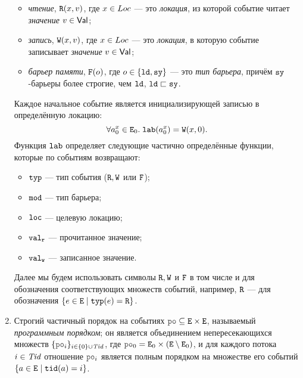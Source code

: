 \begin{definition}
\begin{enumerate}
\begin{itemize}%
\item \emph{чтение}, $\evlab{\lR}{o}{x}{v}$, где $x\in\Loc$ --- это
  \emph{локация}, из которой событие читает \emph{значение} $v\in\Val$;
\item \emph{запись}, $\evlab{\lW}{o}{x}{v}$, где $x\in\Loc$ --- это
  \emph{локация}, в которую событие записывает \emph{значение} $v\in\Val$;
\item \emph{барьер памяти}, $\flab{o}$, где $o\in \{\ld,\full\}$ --- это \emph{тип барьера}, причём $\full$-барьеры более строгие, чем
  $\ld$, $\ld \sqsu \full$.
\end{itemize}%
Каждое начальное событие является инициализирующей записью в определённую локацию:
\[\forall a^x_0 \in \lE_0. \; \lLAB(a^x_0) = \evlab{\lW}{\pln}{x}{0}.\]
Функция $\lLAB$ определяет следующие частично определённые функции, которые по событиям возвращают:
\begin{itemize}
  \item $\lTYP$ --- тип события ($\lR,\lW$ или $\lF$);
  \item $\lMOD$ --- тип барьера;
  \item $\lLOC$ --- целевую локацию;
  \item $\lVALR$ --- прочитанное значение;
  \item $\lVALW$ --- записанное значение.
\end{itemize}
Далее мы будем использовать символы $\lR, \lW$ и $\lF$ в том числе и для обозначения соответствующих множеств
событий, например, $\lR$ --- для обозначения $\{e\in \lE \suchthat \lTYP(e)=\lR\}$.
\item Строгий частичный порядок на событиях $\lPO \suq \lE \times \lE$, называемый \emph{программным порядком}; он
      является объединением непересекающихся множеств $\{\lPO_i\}_{i\in \{0\} \cup \Tid}$,
      где $\lPO_0=\lE_0\times (\lE\setminus \lE_0)$, и для каждого потока 
      $i\in\Tid$ отношение $\lPO_i$ является полным порядком на множестве его событий 
      $\{a\in \lE \suchthat \lTID(a)=i\}$.

\end{enumerate}
\end{definition}

